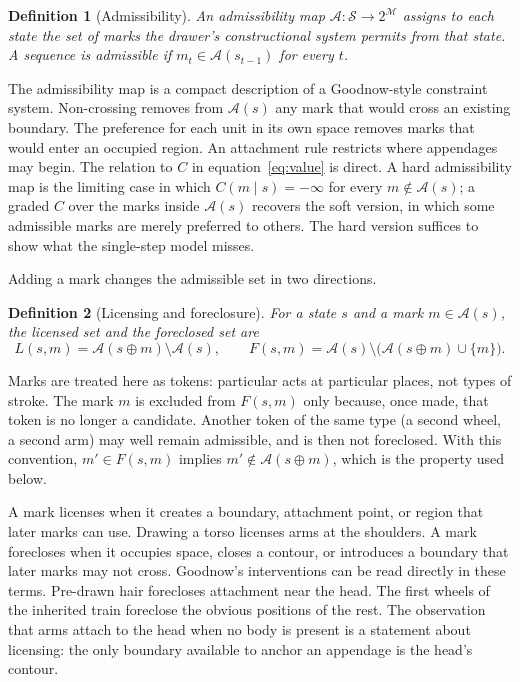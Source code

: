 \documentclass[11pt]{article}
\newtheorem{definition}{Definition}
\theoremstyle{remark}
\newcommand{\A}{\mathcal{A}}
\newcommand{\M}{\mathcal{M}}
\newcommand{\Sset}{\mathcal{S}}
\begin{document}
\begin{definition}[Admissibility]
An \emph{admissibility map} $\A : \Sset \to 2^{\M}$ assigns to each state the set of marks the drawer's constructional system permits from that state. A sequence is \emph{admissible} if $m_t \in \A(s_{t-1})$ for every $t$.
\end{definition}

The admissibility map is a compact description of a Goodnow-style constraint system. Non-crossing removes from $\A(s)$ any mark that would cross an existing boundary. The preference for each unit in its own space removes marks that would enter an occupied region. An attachment rule restricts where appendages may begin. The relation to $C$ in equation~\eqref{eq:value} is direct. A hard admissibility map is the limiting case in which $C(m \mid s) = -\infty$ for every $m \notin \A(s)$; a graded $C$ over the marks inside $\A(s)$ recovers the soft version, in which some admissible marks are merely preferred to others. The hard version suffices to show what the single-step model misses.

Adding a mark changes the admissible set in two directions.

\begin{definition}[Licensing and foreclosure]
For a state $s$ and a mark $m \in \A(s)$, the \emph{licensed set} and the \emph{foreclosed set} are
\[
L(s,m) = \A(s \oplus m) \setminus \A(s), \qquad
F(s,m) = \A(s) \setminus \big(\A(s \oplus m) \cup \{m\}\big).
\]
\end{definition}

Marks are treated here as tokens: particular acts at particular places, not types of stroke. The mark $m$ is excluded from $F(s,m)$ only because, once made, that token is no longer a candidate. Another token of the same type (a second wheel, a second arm) may well remain admissible, and is then not foreclosed. With this convention, $m' \in F(s,m)$ implies $m' \notin \A(s \oplus m)$, which is the property used below.

A mark licenses when it creates a boundary, attachment point, or region that later marks can use. Drawing a torso licenses arms at the shoulders. A mark forecloses when it occupies space, closes a contour, or introduces a boundary that later marks may not cross. Goodnow's interventions can be read directly in these terms. Pre-drawn hair forecloses attachment near the head. The first wheels of the inherited train foreclose the obvious positions of the rest. The observation that arms attach to the head when no body is present is a statement about licensing: the only boundary available to anchor an appendage is the head's contour.
\end{document}
